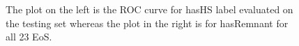 \begin{figure}[htp]
  \centering
  \quad
  \caption{The plot on the left is the ROC curve for hasHS label evaluated on the testing set whereas the plot in the right is for hasRemnant for all 23 EoS. }
  \label{fig:ROC}
\end{figure}






